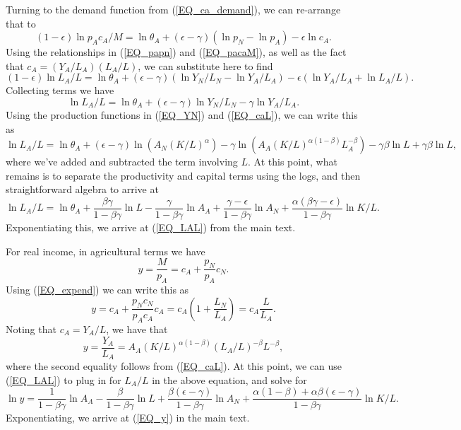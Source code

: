 \documentclass[11pt]{article}
\begin{document}
Turning to the demand function from (\ref{EQ_ca_demand}), we can re-arrange that to
\begin{equation}
   (1-\epsilon) \ln p_A c_A/M = \ln \theta_A  + (\epsilon-\gamma)(\ln p_N - \ln p_A) - \epsilon \ln c_A. \nonumber
\end{equation}
Using the relationships in (\ref{EQ_papn}) and (\ref{EQ_pacaM}), as well as the fact that $c_A = (Y_A/L_A)(L_A/L)$, we can substitute here to find
\begin{equation}
    (1-\epsilon)\ln L_A/L = \ln \theta_A + (\epsilon-\gamma)\left(\ln Y_N/L_N - \ln Y_A/L_A \right) - \epsilon \left(\ln Y_A/L_A + \ln L_A/L \right). \nonumber
\end{equation}
Collecting terms we have
\begin{equation}
    \ln L_A/L = \ln \theta_A + (\epsilon-\gamma) \ln Y_N/L_N - \gamma \ln Y_A/L_A. \nonumber
\end{equation}
Using the production functions in (\ref{EQ_YN}) and (\ref{EQ_caL}), we can write this as
\begin{equation}
    \ln L_A/L = \ln \theta_A + (\epsilon-\gamma) \ln \left(A_N (K/L)^{\alpha}\right) - \gamma \ln \left(A_A (K/L)^{\alpha(1-\beta)} L_A^{-\beta}\right) - \gamma \beta \ln L + \gamma \beta \ln L, \nonumber
\end{equation}
where we've added and subtracted the term involving $L$. At this point, what remains is to separate the productivity and capital terms using the logs, and then straightforward algebra to arrive at
\begin{equation}
    \ln L_A/L = \ln \theta_A + \frac{\beta\gamma}{1-\beta\gamma} \ln L - \frac{\gamma}{1-\beta\gamma} \ln A_A + \frac{\gamma - \epsilon}{1-\beta\gamma} \ln A_N + \frac{\alpha(\beta\gamma - \epsilon)}{1-\beta\gamma} \ln K/L. \nonumber
\end{equation}
Exponentiating this, we arrive at (\ref{EQ_LAL}) from the main text.

For real income, in agricultural terms we have
\begin{equation}
    y = \frac{M}{p_A} = c_A + \frac{p_N}{p_A} c_N. \nonumber
\end{equation}
Using (\ref{EQ_expend}) we can write this as
\begin{equation}
    y = c_A + \frac{p_N c_N}{p_A c_A}c_A = c_A \left(1 + \frac{L_N}{L_A}\right) = c_A \frac{L}{L_A}. \nonumber
\end{equation}
Noting that $c_A = Y_A/L$, we have that
\begin{equation}
    y = \frac{Y_A}{L_A} = A_A (K/L)^{\alpha(1-\beta)} (L_A/L)^{-\beta} L^{-\beta}, \nonumber
\end{equation}
where the second equality follows from (\ref{EQ_caL}). At this point, we can use (\ref{EQ_LAL}) to plug in for $L_A/L$ in the above equation, and solve for 
\begin{equation}
    \ln y = \frac{1}{1-\beta\gamma} \ln A_A - \frac{\beta}{1-\beta\gamma} \ln L + \frac{\beta(\epsilon-\gamma)}{1-\beta\gamma} \ln A_N + \frac{\alpha(1-\beta) + \alpha\beta(\epsilon-\gamma)}{1-\beta\gamma} \ln K/L. \nonumber
\end{equation}
Exponentiating, we arrive at (\ref{EQ_y}) in the main text.
\end{document}
